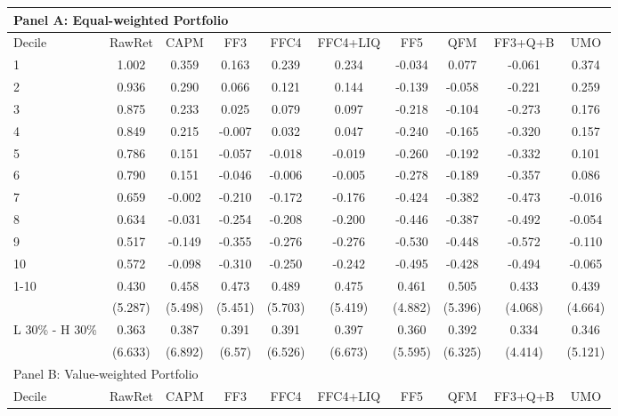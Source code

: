 \begin{tabular}{lccccccccc}
\toprule
\toprule
\multicolumn{10}{l}{Panel A: Equal-weighted Portfolio} \\
\midrule
Decile  & RawRet  & CAPM    & FF3     & FFC4    & FFC4+LIQ & FF5     & QFM     & FF3+Q+B & UMO \\
\midrule
1       & 1.002   & 0.359   & 0.163   & 0.239   & 0.234   & -0.034  & 0.077   & -0.061  & 0.374 \\
2       & 0.936   & 0.290   & 0.066   & 0.121   & 0.144   & -0.139  & -0.058  & -0.221  & 0.259 \\
3       & 0.875   & 0.233   & 0.025   & 0.079   & 0.097   & -0.218  & -0.104  & -0.273  & 0.176 \\
4       & 0.849   & 0.215   & -0.007  & 0.032   & 0.047   & -0.240  & -0.165  & -0.320  & 0.157 \\
5       & 0.786   & 0.151   & -0.057  & -0.018  & -0.019  & -0.260  & -0.192  & -0.332  & 0.101 \\
6       & 0.790   & 0.151   & -0.046  & -0.006  & -0.005  & -0.278  & -0.189  & -0.357  & 0.086 \\
7       & 0.659   & -0.002  & -0.210  & -0.172  & -0.176  & -0.424  & -0.382  & -0.473  & -0.016 \\
8       & 0.634   & -0.031  & -0.254  & -0.208  & -0.200  & -0.446  & -0.387  & -0.492  & -0.054 \\
9       & 0.517   & -0.149  & -0.355  & -0.276  & -0.276  & -0.530  & -0.448  & -0.572  & -0.110 \\
10      & 0.572   & -0.098  & -0.310  & -0.250  & -0.242  & -0.495  & -0.428  & -0.494  & -0.065 \\
\midrule
\multirow{2}[1]{*}{1-10} & 0.430   & 0.458   & 0.473   & 0.489   & 0.475   & 0.461   & 0.505   & 0.433   & 0.439 \\
        & (5.287) & (5.498) & (5.451) & (5.703) & (5.419) & (4.882) & (5.396) & (4.068) & (4.664) \\
\multicolumn{1}{l}{\multirow{2}[1]{*}{L 30\% - H 30\%}} & 0.363   & 0.387   & 0.391   & 0.391   & 0.397   & 0.360   & 0.392   & 0.334   & 0.346 \\
        & (6.633) & (6.892) & (6.57)  & (6.526) & (6.673) & (5.595) & (6.325) & (4.414) & (5.121) \\
\midrule
\multicolumn{10}{l}{Panel B: Value-weighted Portfolio} \\
\midrule
Decile  & RawRet  & CAPM    & FF3     & FFC4    & FFC4+LIQ & FF5     & QFM     & FF3+Q+B & UMO \\

\end{tabular}
